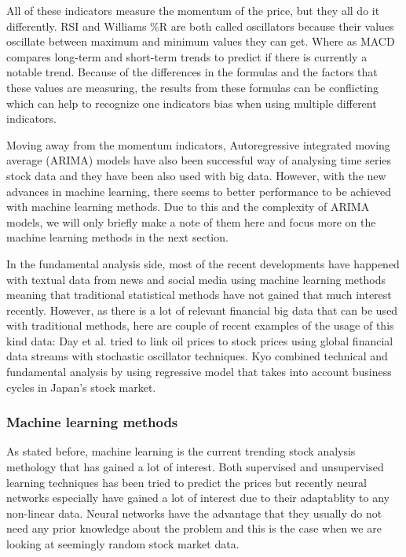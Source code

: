 All of these indicators measure the momentum of the price, but they all do it differently.
RSI and Williams \%R are both called oscillators because their values oscillate between maximum and minimum values they can get.
Where as MACD compares long-term and short-term trends to predict if there is currently a notable trend.
Because of the differences in the formulas and the factors that these values are measuring, the results from these formulas can be conflicting which can help to recognize one indicators bias when using multiple different indicators. \cite{james}

Moving away from the momentum indicators, Autoregressive integrated moving average (ARIMA) models have also been successful way of analysing time series stock data and they have been also used with big data. \cite{wang}
However, with the new advances in machine learning, there seems to better performance to be achieved with machine learning methods. \cite{khashei}
Due to this and the complexity of ARIMA models, we will only briefly make a note of them here and focus more on the machine learning methods in the next section.

In the fundamental analysis side, most of the recent developments have happened with textual data from news and social media using machine learning methods meaning that traditional statistical methods have not gained that much interest recently.
However, as there is a lot of relevant financial big data that can be used with traditional methods, here are couple of recent examples of the usage of this kind data:
Day et al. \cite{day} tried to link oil prices to stock prices using global financial data streams with stochastic oscillator techniques.
Kyo \cite{kyo} combined technical and fundamental analysis by using regressive model that takes into account business cycles in Japan's stock market.

\subsubsection{Machine learning methods}

As stated before, machine learning is the current trending stock analysis methology that has gained a lot of interest.
Both supervised and unsupervised learning techniques has been tried to predict the prices but recently neural networks especially have gained a lot of interest due to their adaptablity to any non-linear data.
Neural networks have the advantage that they usually do not need any prior knowledge about the problem and this is the case when we are looking at seemingly random stock market data.

